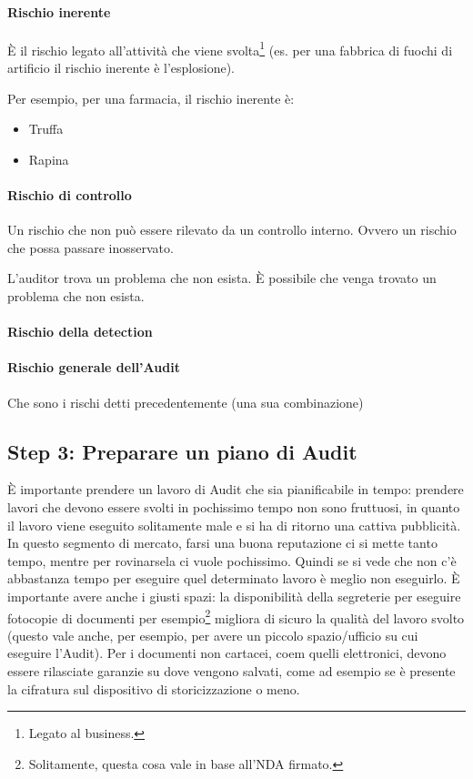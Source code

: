 \paragraph*{Rischio inerente}

È il rischio legato all'attività che viene svolta\footnote{Legato al business.} 
(es. per una fabbrica di fuochi di artificio il rischio inerente è 
l'esplosione).

Per esempio, per una farmacia, il rischio inerente è:
\begin{itemize}
\item Truffa
\item Rapina
\end{itemize}

\paragraph*{Rischio di controllo}

Un rischio che non può essere rilevato da un controllo interno. Ovvero un 
rischio che possa passare inosservato.

L'auditor trova un problema che non esista. È possibile che venga trovato un 
problema che non esista.


\paragraph*{Rischio della detection}



\paragraph*{Rischio generale dell'Audit}

Che sono i rischi detti precedentemente (una sua combinazione)



\subsection{Step 3: Preparare un piano di Audit}

È importante prendere un lavoro di Audit che sia pianificabile in tempo: 
prendere lavori che devono essere svolti in pochissimo tempo non sono fruttuosi, 
in quanto il lavoro viene eseguito solitamente male e si ha di ritorno una 
cattiva pubblicità. In questo segmento di mercato, farsi una buona reputazione 
ci si mette tanto tempo, mentre per rovinarsela ci vuole pochissimo. Quindi se 
si vede che non c'è abbastanza tempo per eseguire quel determinato lavoro è 
meglio non eseguirlo. 
È importante avere anche i giusti spazi: la disponibilità della segreterie per 
eseguire fotocopie di documenti per esempio\footnote{Solitamente, questa cosa 
vale in base all'NDA firmato.} migliora di sicuro la qualità del lavoro svolto 
(questo vale anche, per esempio, per avere un piccolo spazio/ufficio su cui 
eseguire l'Audit). Per i documenti non cartacei, coem quelli elettronici, devono 
essere rilasciate garanzie su dove vengono salvati, come ad esempio se è 
presente la cifratura sul dispositivo di storicizzazione o meno.

